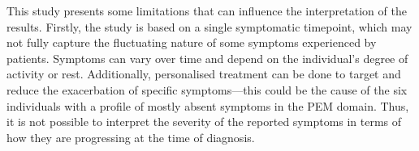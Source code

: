 \bsni
This study presents some limitations that can influence the interpretation of the results.
Firstly, the study is based on a single symptomatic timepoint, which may not fully capture the fluctuating nature of some symptoms experienced by \cfs patients.
Symptoms can vary over time and depend on the individual's degree of activity or rest.
Additionally, personalised treatment can be done to target and reduce the exacerbation of specific symptoms---this could be the cause of the six individuals with a profile of mostly absent symptoms in the PEM domain.
Thus, it is not possible to interpret the severity of the reported symptoms in terms of how they are progressing at the time of diagnosis.

